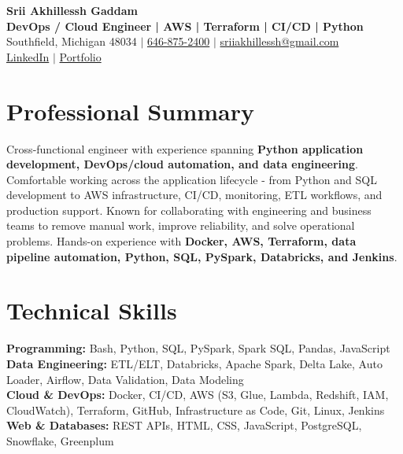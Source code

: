 \documentclass[letterpaper,10pt]{article}
\begin{document}
\fontsize{9.35pt}{10.45pt}\selectfont

\begin{center}
    {\LARGE \textbf{Srii Akhillessh Gaddam}} \\[-1pt]
    \textbf{DevOps / Cloud Engineer | AWS | Terraform | CI/CD | Python} \\[2pt]
    Southfield, Michigan 48034 $|$
    \href{tel:6468752400}{646-875-2400} $|$
    \href{mailto:sriiakhillessh@gmail.com}{sriiakhillessh@gmail.com} \\[1pt]
    \href{https://www.linkedin.com/in/srii-akhiilessh-gaddam-b48668191/}{LinkedIn} $|$
    \href{https://sriiakhillesshg.github.io/portfolio/}{Portfolio}
\end{center}
\vspace{-8pt}

\section{Professional Summary}
\small{Cross-functional engineer with experience spanning \textbf{Python application development, DevOps/cloud automation, and data engineering}. Comfortable working across the application lifecycle - from Python and SQL development to AWS infrastructure, CI/CD, monitoring, ETL workflows, and production support. Known for collaborating with engineering and business teams to remove manual work, improve reliability, and solve operational problems. Hands-on experience with \textbf{Docker, AWS, Terraform, data pipeline automation, Python, SQL, PySpark, Databricks, and Jenkins}.}

\section{Technical Skills}
\small{
\textbf{Programming:} Bash, Python, SQL, PySpark, Spark SQL, Pandas, JavaScript \\
\textbf{Data Engineering:} ETL/ELT, Databricks, Apache Spark, Delta Lake, Auto Loader, Airflow, Data Validation, Data Modeling \\
\textbf{Cloud \& DevOps:} Docker, CI/CD, AWS (S3, Glue, Lambda, Redshift, IAM, CloudWatch), Terraform, GitHub, Infrastructure as Code, Git, Linux, Jenkins \\
\textbf{Web \& Databases:} REST APIs, HTML, CSS, JavaScript, PostgreSQL, Snowflake, Greenplum
}
\end{document}
